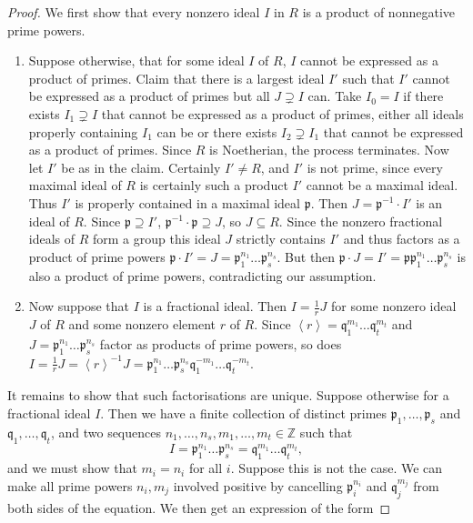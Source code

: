 \documentclass{article}
\newcommand{\Z}{\mathbb{Z}}
\newcommand{\ab}[1]{\left\langle #1 \right\rangle}
\theoremstyle{definition}\newtheorem{definition}{Definition}[subsection]
\theoremstyle{definition}\newtheorem{remark}[definition]{Remark}
\theoremstyle{definition}\newtheorem*{example}{Example}
\theoremstyle{definition}\newtheorem*{note}{Note}
\begin{document}
\begin{proof}
We first show that every nonzero ideal $ I $ in $ R $ is a product of nonnegative prime powers.
\begin{enumerate}
\item Suppose otherwise, that for some ideal $ I $ of $ R $, $ I $ cannot be expressed as a product of primes. Claim that there is a largest ideal $ I' $ such that $ I' $ cannot be expressed as a product of primes but all $ J \supsetneq I $ can. Take $ I_0 = I $ if there exists $ I_1 \supsetneq I $ that cannot be expressed as a product of primes, either all ideals properly containing $ I_1 $ can be or there exists $ I_2 \supsetneq I_1 $ that cannot be expressed as a product of primes. Since $ R $ is Noetherian, the process terminates. Now let $ I' $ be as in the claim. Certainly $ I' \ne R $, and $ I' $ is not prime, since every maximal ideal of $ R $ is certainly such a product $ I' $ cannot be a maximal ideal. Thus $ I' $ is properly contained in a maximal ideal $ \mathfrak{p} $. Then $ J = \mathfrak{p}^{-1} \cdot I' $ is an ideal of $ R $. Since $ \mathfrak{p} \supseteq I' $, $ \mathfrak{p}^{-1} \cdot \mathfrak{p} \supseteq J $, so $ J \subseteq R $. Since the nonzero fractional ideals of $ R $ form a group this ideal $ J $ strictly contains $ I' $ and thus factors as a product of prime powers $ \mathfrak{p} \cdot I' = J = \mathfrak{p}_1^{n_1} \dots \mathfrak{p}_s^{n_s} $. But then $ \mathfrak{p} \cdot J = I' = \mathfrak{p}\mathfrak{p}_1^{n_1} \dots \mathfrak{p}_s^{n_s} $ is also a product of prime powers, contradicting our assumption.
\item Now suppose that $ I $ is a fractional ideal. Then $ I = \tfrac{1}{r}J $ for some nonzero ideal $ J $ of $ R $ and some nonzero element $ r $ of $ R $. Since $ \ab{r} = \mathfrak{q}_1^{m_1} \dots \mathfrak{q}_t^{m_t} $ and $ J = \mathfrak{p}_1^{n_1} \dots \mathfrak{p}_s^{n_s} $ factor as products of prime powers, so does $ I = \tfrac{1}{r}J = \ab{r}^{-1}J = \mathfrak{p}_1^{n_1} \dots \mathfrak{p}_s^{n_s}\mathfrak{q}_1^{-m_1} \dots \mathfrak{q}_t^{-m_t} $.
\end{enumerate}
It remains to show that such factorisations are unique. Suppose otherwise for a fractional ideal $ I $. Then we have a finite collection of distinct primes $ \mathfrak{p}_1, \dots, \mathfrak{p}_s $ and $ \mathfrak{q}_1, \dots, \mathfrak{q}_t $, and two sequences $ n_1, \dots, n_s, m_1, \dots, m_t \in \Z $ such that
$$ I = \mathfrak{p}_1^{n_1} \dots \mathfrak{p}_s^{n_s} = \mathfrak{q}_1^{m_1} \dots \mathfrak{q}_t^{m_t}, $$
and we must show that $ m_i = n_i $ for all $ i $. Suppose this is not the case. We can make all prime powers $ n_i, m_j $ involved positive by cancelling $ \mathfrak{p}_i^{n_i} $ and $ \mathfrak{q}_j^{m_j} $ from both sides of the equation. We then get an expression of the form

\end{proof}
\end{document}

